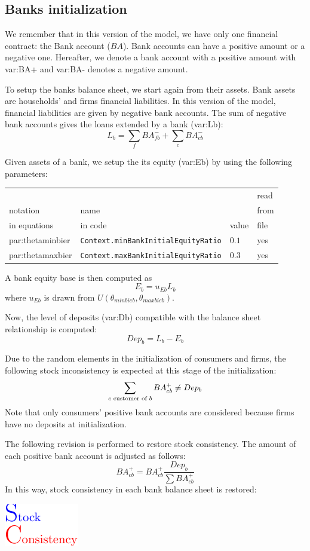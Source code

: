 \documentclass{book}
\begin{document}
\subsection{Banks initialization}
We remember that in this version of the model, we have only one financial contract: the Bank account ($BA$). Bank accounts can have a positive amount or a negative one. Hereafter, we denote a bank account with a positive amount with \gls{var:BA+} and \gls{var:BA-} denotes a negative amount.

To setup the banks balance sheet, we start again from their assets. Bank assets are households' and firms financial liabilities. In this version of the model, financial liabilities are given by negative bank accounts. 
The sum of negative bank accounts gives the loans extended by a bank (\gls{var:Lb}):
\[
	L_b=\sum_f BA_{fb}^- + \sum_c BA_{cb}^-
\]



Given assets of a bank, we setup the its equity (\gls{var:Eb}) by using the following\\
parameters:\\
\begin{tabular}{l l l l}
	\hline
	& &&read\\
	notation& name &&from\\
	in equations& in code&value&file\\
	\hline
	\hline
 \gls{par:thetaminbier}&\verb+Context.minBankInitialEquityRatio+&$0.1$&yes\\
 \gls{par:thetamaxbier}&\verb+Context.maxBankInitialEquityRatio+&$0.3$&yes\\
	\hline
\end{tabular}

\vskip5mm
A bank equity base is then computed as
\[
	E_b=u_{Eb}L_b
\]
where $u_{Eb}$ is drawn from $U(\theta_{minbieb},\theta_{maxbieb})$.

Now, the level of deposits (\gls{var:Db}) compatible with the balance sheet relationship is computed:
\[
Dep_b=L_b-E_b
\]

Due to the random elements in the initialization of consumers and firms, the following stock inconsistency is expected at this stage of the initialization:
\[
	\sum_{c \textnormal{ customer of } b} BA^+_{cb} \neq Dep_b
\]
Note that only consumers' positive bank accounts are considered because firms have no deposits at initialization.

The following revision is performed to restore stock consistency. The amount of each positive bank account is adjusted as follows:
\[
	BA^{+}_{cb}=BA^+_{cb}\frac{Dep_b}{\sum BA^+_{cb}}
\]
In this way, stock consistency in each bank balance sheet is restored:\begin{marginfigure}
	\hskip1cm\includegraphics[scale=1.0]{sc_logo-0.pdf}
\end{marginfigure}
\end{document}
